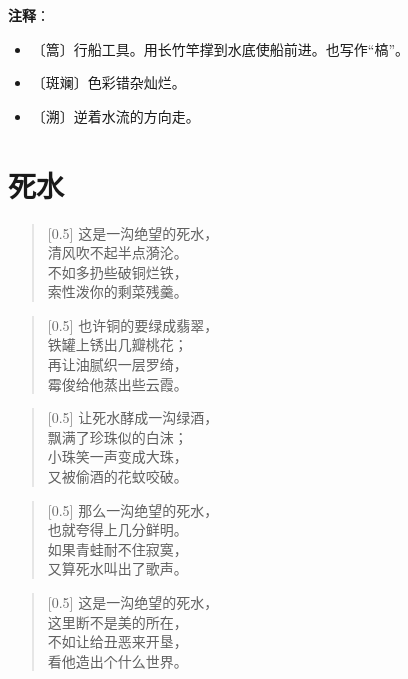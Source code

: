 \documentclass[12pt,UTF-8,openany]{ctexbook}
\begin{document}
\newpage

\textbf{注释}：

\vspace{-1em}

\begin{itemize}
    \setlength\itemsep{-0.2em}
    \item 〔篙〕行船工具。用长竹竿撑到水底使船前进。也写作“槁”。
    \item 〔斑斓〕色彩错杂灿烂。
    \item 〔溯〕逆着水流的方向走。
\end{itemize}

\chapter{死水}

\begin{large}
    
    \begin{verse}[0.5\linewidth]
        这是一沟绝望的死水， \\
        清风吹不起半点漪沦。 \\
        不如多扔些破铜烂铁， \\
        索性泼你的剩菜残羹。
    \end{verse}
    
    
    \begin{verse}[0.5\linewidth]
        也许铜的要绿成翡翠， \\
        铁罐上锈出几瓣桃花； \\
        再让油腻织一层罗绮， \\
        霉俊给他蒸出些云霞。
    \end{verse}
    
    
    \begin{verse}[0.5\linewidth]
        让死水酵成一沟绿酒， \\
        飘满了珍珠似的白沫； \\
        小珠笑一声变成大珠， \\
        又被偷酒的花蚊咬破。
    \end{verse}
    
    
    \begin{verse}[0.5\linewidth]
        那么一沟绝望的死水， \\
        也就夸得上几分鲜明。 \\
        如果青蛙耐不住寂寞， \\
        又算死水叫出了歌声。
    \end{verse}
    
    
    \begin{verse}[0.5\linewidth]
        这是一沟绝望的死水， \\
        这里断不是美的所在， \\
        不如让给丑恶来开垦， \\
        看他造出个什么世界。
    \end{verse}
    
\end{large}
\end{document}
